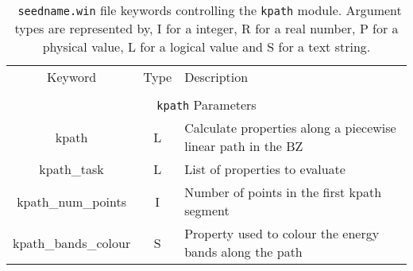 \begin{table}[h!]
\begin{center}
\begin{tabular}{|c|c|p{6cm}|}
  \hline
  Keyword & Type & Description \\
  &      &             \\
  \hline\hline
  \multicolumn{3}{|c|}{{\tt kpath} Parameters} \\
  \hline
  {\sc kpath}  & L & Calculate properties along a piecewise linear path in the BZ \\
  {\sc kpath\_task}& L & List of properties to evaluate\\
  {\sc kpath\_num\_points}& I & Number of points in the first kpath segment\\
  {\sc kpath\_bands\_colour}& S & Property used to colour the energy bands along the path\\
  \hline
\end{tabular}
\caption[Parameter file keywords controlling the kpath module.]  {{\tt
    seedname.win} file keywords controlling the {\tt kpath}
  module. Argument types are represented by, I for a integer, R for a
  real number, P for a physical value, L for a logical value and S for
  a text string.}
\label{parameter_keywords_kpath}
\end{center}
\end{table}

